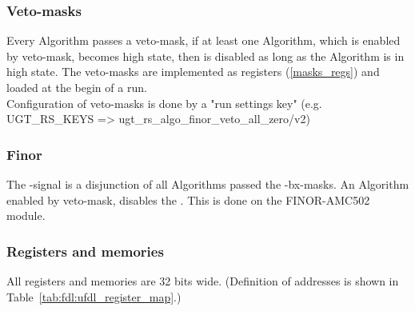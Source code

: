 \subsubsection{Veto-masks}
\label{sec:fdl:veto_masks}

Every Algorithm passes a veto-mask, if at least one Algorithm, which is enabled by veto-mask, becomes high state, then \finor is disabled as long as the Algorithm is in high state.
The veto-masks are implemented as registers (\ref{masks_regs}) and loaded at the begin of a run.\\
Configuration of veto-masks is done by a "run settings key" (e.g. UGT\_RS\_KEYS => ugt\_rs\_algo\_finor\_veto\_all\_zero/v2)

\subsubsection{Finor}
\label{sec:fdl:finor}

The \finor-signal is a disjunction of all Algorithms passed the \finor-bx-masks. An Algorithm enabled by veto-mask, disables the \finor. This is done on the FINOR-AMC502 module.

\clearpage
\subsubsection{Registers and memories}
\label{sec:fdl:reg_mem}

All registers and memories are 32 bits wide. (Definition of addresses is shown in Table~\ref{tab:fdl:ufdl_register_map}.)

